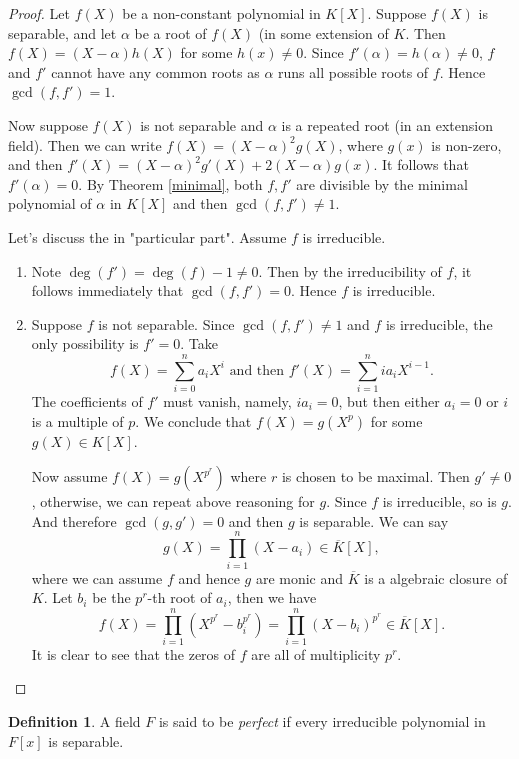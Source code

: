 \documentclass[12pt]{report}
\theoremstyle{definition}
\newtheorem{definition}[theorem]{Definition}
\begin{document}
\begin{proof}
	Let $f(X)$ be a non-constant polynomial in $K[X]$. Suppose $f(X)$ is separable, and let $\alpha$ be a root of $f(X)$ (in some extension of $K$. Then $f(X) = (X -\alpha)h(X)$ for some $h(x)\not=0$. Since $f'(\alpha)=h(\alpha)\not=0$, $f$ and $f'$ cannot have any common roots as $\alpha$ runs all possible roots of $f$. Hence $\gcd(f,f')=1$.

	Now suppose $f(X)$ is not separable and $\alpha$ is a repeated root (in an extension field). Then we can write $f(X)=(X-\alpha)^2g(X)$, where $g(x)$ is non-zero, and then  $f'(X)= (X-\alpha)^2g'(X)+2(X-\alpha)g(x)$. It follows that $f'(\alpha)=0$. By Theorem \ref{minimal}, both $f,f'$ are divisible by the minimal polynomial of $\alpha$ in $K[X]$ and then $\gcd(f,f')\not=1$.

	\smallskip

	Let's discuss the in "particular part". Assume $f$ is irreducible.
	\begin{enumerate}
		\item Note $\deg(f')=\deg(f)-1\not=0$. Then by the irreducibility of $f$, it follows immediately that $\gcd(f,f')=0$. Hence $f$ is irreducible.
		\item Suppose $f$ is not separable. Since $\gcd(f,f')\not=1$ and $f$ is irreducible, the only possibility is $f'=0$. Take $$f(X)=\sum_{i=0}^n a_i X^i \mbox{ and then } f'(X)=\sum_{i=1}^n ia_i X^{i-1}.$$ The coefficients of $f'$ must vanish, namely, $ia_i =  0$, but then either $a_i=0$ or $i$ is a multiple of $p$. We conclude that $f(X)=g(X^p)$ for some $g(X)\in K[X]$.

		      Now assume $f(X)=g(X^{p^r})$ where $r$ is chosen to be maximal. Then $g'\not=0$, otherwise, we can repeat above reasoning for $g$. Since $f$ is irreducible, so is $g$. And therefore $\gcd(g,g')=0$ and then $g$ is separable. We can say $$g(X)=\prod_{i=1}^n (X-a_i)\in \overline{K}[X],$$ where we can assume $f$ and hence $g$ are monic and $\overline{K}$ is a algebraic closure of $K$.  Let $b_i$ be the $p^r$-th root of $a_i$, then we have $$f(X)=\prod_{i=1}^n (X^{p^r}-b_i^{p^r})=\prod_{i=1}^n (X-b_i)^{p^r}\in \overline{K}[X].$$
		      It is clear to see that the zeros of $f$ are all of multiplicity $p^r$.
	\end{enumerate}
\end{proof}

\begin{definition}
	A field $F$ is said to be \emph{perfect} if every irreducible polynomial in $F[x]$ is separable.
\end{definition}
\end{document}
